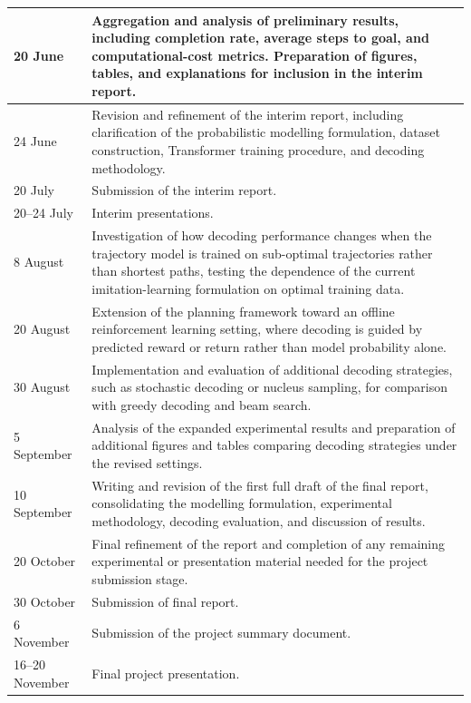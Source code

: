 \documentclass[12pt]{article}
\begin{document}
\begin{longtable}{|p{3cm}|p{11cm}|}
20 June &
Aggregation and analysis of preliminary results, including completion rate, average steps to goal, and computational-cost metrics. Preparation of figures, tables, and explanations for inclusion in the interim report. \\
\hline

24 June &
Revision and refinement of the interim report, including clarification of the probabilistic modelling formulation, dataset construction, Transformer training procedure, and decoding methodology. \\
\hline

20 July &
Submission of the interim report. \\
\hline

20--24 July &
Interim presentations. \\
\hline

8 August &
Investigation of how decoding performance changes when the trajectory model is trained on sub-optimal trajectories rather than shortest paths, testing the dependence of the current imitation-learning formulation on optimal training data. \\
\hline

20 August &
Extension of the planning framework toward an offline reinforcement learning setting, where decoding is guided by predicted reward or return rather than model probability alone. \\
\hline

30 August &
Implementation and evaluation of additional decoding strategies, such as stochastic decoding or nucleus sampling, for comparison with greedy decoding and beam search. \\
\hline

5 September &
Analysis of the expanded experimental results and preparation of additional figures and tables comparing decoding strategies under the revised settings. \\
\hline

10 September &
Writing and revision of the first full draft of the final report, consolidating the modelling formulation, experimental methodology, decoding evaluation, and discussion of results. \\
\hline

20 October &
Final refinement of the report and completion of any remaining experimental or presentation material needed for the project submission stage. \\
\hline

30 October &
Submission of final report. \\
\hline

6 November &
Submission of the project summary document. \\
\hline

16--20 November &
Final project presentation. \\
\hline

\end{longtable}
\end{document}
